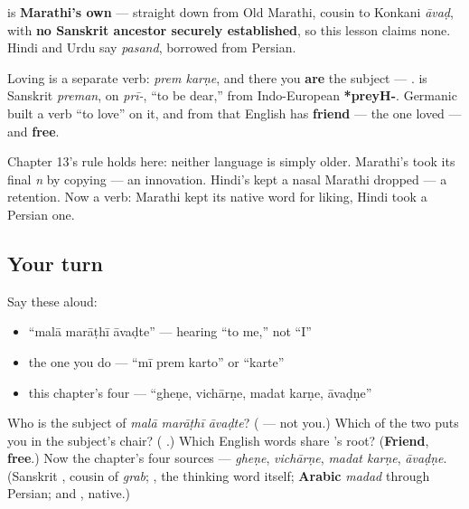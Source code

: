 \begin{cousinweb}
\textbf{} is \textbf{Marathi's own} — straight down from Old Marathi, cousin to Konkani \emph{āvaḍ}, with \textbf{no Sanskrit ancestor securely established}, so this lesson claims none. Hindi and Urdu say \textbf{} \emph{pasand}, borrowed from Persian.

Loving is a separate verb: \textbf{ } \emph{prem karṇe}, and there you \textbf{are} the subject — \textbf{  }. \textbf{} is Sanskrit \emph{preman}, on \textbf{} \emph{prī-}, \textquotedblleft{}to be dear,\textquotedblright{} from Indo-European \textbf{*preyH-}. Germanic built a verb \textquotedblleft{}to love\textquotedblright{} on it, and from that English has \textbf{friend} — the one loved — and \textbf{free}.
\end{cousinweb}

\begin{culture}
Chapter 13's rule holds here: neither language is simply older. Marathi's \textbf{} took its final \emph{n} by copying \textbf{} — an innovation. Hindi's \textbf{} kept a nasal Marathi dropped — a retention. Now a verb: Marathi kept its native word for liking, Hindi took a Persian one.
\end{culture}

\subsection*{Your turn}
Say these aloud:

\begin{itemize}
\raggedright
  \item \textquotedblleft{}malā marāṭhī āvaḍte\textquotedblright{} — hearing \textquotedblleft{}to me,\textquotedblright{} not \textquotedblleft{}I\textquotedblright{}
  \item the one you do — \textquotedblleft{}mī prem karto\textquotedblright{} or \textquotedblleft{}karte\textquotedblright{}
  \item this chapter's four — \textquotedblleft{}gheṇe, vichārṇe, madat karṇe, āvaḍṇe\textquotedblright{}
\end{itemize}

\begin{tcolorbox}[breakable,colback=teal!4,colframe=teal!35!black,title={Before you move on}]
Who is the subject of \emph{malā marāṭhī āvaḍte}? (\textbf{} — not you.) Which of the two puts you in the subject's chair? (\textbf{ }.) Which English words share \textbf{}'s root? (\textbf{Friend}, \textbf{free}.) Now the chapter's four sources — \emph{gheṇe}, \emph{vichārṇe}, \emph{madat karṇe}, \emph{āvaḍṇe}. (Sanskrit \textbf{}, cousin of \emph{grab}; \textbf{}, the thinking word itself; \textbf{Arabic} \emph{madad} through Persian; and \textbf{}, native.)
\end{tcolorbox}
